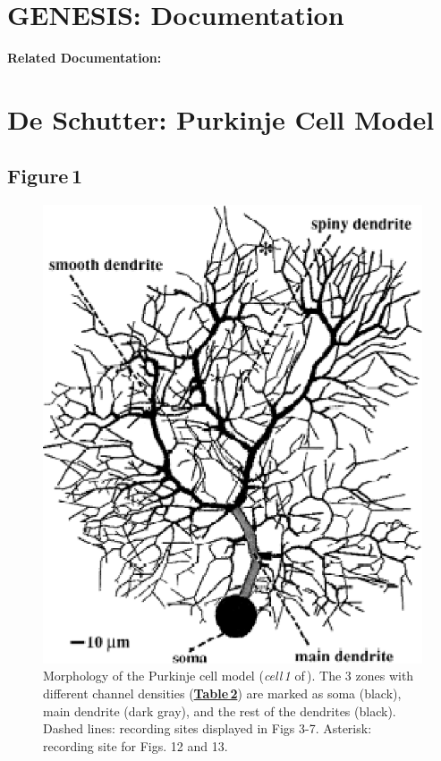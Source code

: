 \documentclass[12pt]{article}
\begin{document}
\section*{GENESIS: Documentation}

{\bf Related Documentation:}

\section*{De Schutter: Purkinje Cell Model}

\subsection*{Figure\,1}

\begin{figure}[h]
\centering
   \includegraphics[scale=0.6]{figures/Fig.1.1.eps}
   \caption{Morphology of the Purkinje cell model ({\it cell\,1} of\,\cite{Rapp-P:1994qf}).  The 3 zones with different channel densities (\href{../pub-purkinje-deschutter1-table-2/pub-purkinje-deschutter1-table-2.tex}{\bf Table\,2}) are marked
as soma (black), main dendrite (dark gray), and the rest of the dendrites
(black). Dashed lines: recording sites displayed in Figs 3-7. Asterisk: recording
site for Figs. 12 and 13.}
   \label{fig:DS1.1}
\end{figure}



\end{document}
